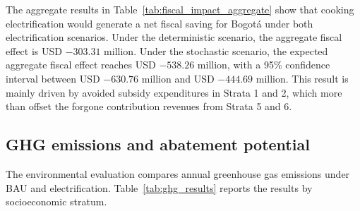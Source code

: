 \documentclass[authoryear,preprint,review,10pt]{elsarticle}
\begin{document}
\begin{table}[H]
\centering
\caption{Aggregate fiscal impact of cooking electrification by socioeconomic stratum in Bogotá}
\label{tab:fiscal_impact_aggregate}

\end{table}

The aggregate results in Table~\ref{tab:fiscal_impact_aggregate} show that cooking electrification would generate a net fiscal saving for Bogotá under both electrification scenarios. Under the deterministic scenario, the aggregate fiscal effect is USD $-303.31$ million. Under the stochastic scenario, the expected aggregate fiscal effect reaches USD $-538.26$ million, with a 95\% confidence interval between USD $-630.76$ million and USD $-444.69$ million. This result is mainly driven by avoided subsidy expenditures in Strata 1 and 2, which more than offset the forgone contribution revenues from Strata 5 and 6.

\subsection{GHG emissions and abatement potential}
\label{results:ghg}

The environmental evaluation compares annual greenhouse gas emissions under BAU and electrification. Table~\ref{tab:ghg_results} reports the results by socioeconomic stratum.
\end{document}
